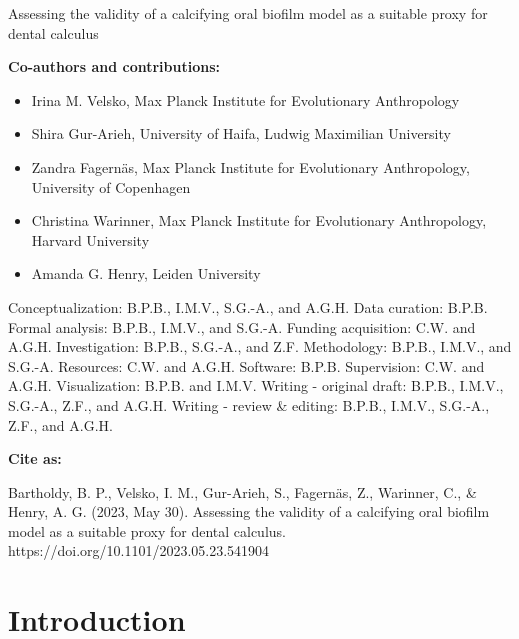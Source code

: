 \documentclass[
  b5paper,
]{book}
\providecommand{\tightlist}{%
  \setlength{\itemsep}{0pt}\setlength{\parskip}{0pt}}
\begin{document}
Assessing the validity of a calcifying oral biofilm model as a suitable
proxy for dental calculus

\hfill\break

\footnotesize

\textbf{Co-authors and contributions:}

\begin{itemize}
\tightlist
\item
  Irina M. Velsko, Max Planck Institute for Evolutionary Anthropology
\item
  Shira Gur-Arieh, University of Haifa, Ludwig Maximilian University
\item
  Zandra Fagernäs, Max Planck Institute for Evolutionary Anthropology,
  University of Copenhagen
\item
  Christina Warinner, Max Planck Institute for Evolutionary
  Anthropology, Harvard University
\item
  Amanda G. Henry, Leiden University
\end{itemize}

Conceptualization: B.P.B., I.M.V., S.G.-A., and A.G.H. Data curation:
B.P.B. Formal analysis: B.P.B., I.M.V., and S.G.-A. Funding acquisition:
C.W. and A.G.H. Investigation: B.P.B., S.G.-A., and Z.F. Methodology:
B.P.B., I.M.V., and S.G.-A. Resources: C.W. and A.G.H. Software: B.P.B.
Supervision: C.W. and A.G.H. Visualization: B.P.B. and I.M.V. Writing -
original draft: B.P.B., I.M.V., S.G.-A., Z.F., and A.G.H. Writing -
review \& editing: B.P.B., I.M.V., S.G.-A., Z.F., and A.G.H.

\textbf{Cite as:}

Bartholdy, B. P., Velsko, I. M., Gur-Arieh, S., Fagernäs, Z., Warinner,
C., \& Henry, A. G. (2023, May 30). Assessing the validity of a
calcifying oral biofilm model as a suitable proxy for dental calculus.
https://doi.org/10.1101/2023.05.23.541904

\normalsize

\newpage{}

\section{Introduction}\label{introduction}
\end{document}
